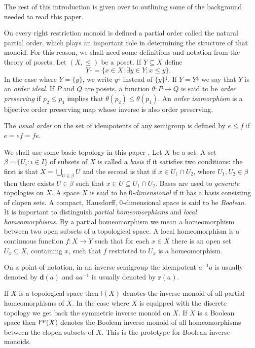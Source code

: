 \documentclass[a4paper]{amsart}
\begin{document}
The rest of this introduction is given over to outlining some of the background needed to read this paper.

On every right restriction monoid is defined a partial order called the natural partial order,
which plays an important role in determining the structure of that monoid.
For this reason, we shall need some definitions and notation from the theory of posets.
Let $(X,\leq)$ be a poset.
If $Y \subseteq X$ define 
$$Y^{\downarrow} = \{x \in X \colon \exists y \in Y;  x \leq y\}.$$
In the case where $Y = \{y\}$, we write  $y^{\downarrow}$ 
instead of $\{y\}^{\downarrow}$. 
If $Y = Y^{\downarrow}$ we say that $Y$ is an {\em order ideal}.
If $P$ and $Q$ are posets, a function $\theta \colon P \rightarrow Q$ is said to be {\em order preserving}
if $p_{2} \leq p_{1}$ implies that $\theta (p_{2}) \leq \theta (p_{1})$.
An {\em order isomorphism} is a bijective order preserving map
whose inverse is also order preserving.

The {\em usual order} on the set of idempotents of any semigroup is defined by $e \leq f$ if $e = ef = fe$.

We shall use some basic topology in this paper \cite{Willard}.
Let $X$ be a set.
A set $\beta = \{ U_{i} \colon i \in I \}$
of subsets of $X$ is called a {\em basis}
if it satisfies two conditions:
the first is that $X = \bigcup_{U \in \beta} U$
and the second is that if $x \in U_{1} \cap U_{2}$, where $U_{1},U_{2} \in \beta$
then there exists $U \in \beta$ such that $x \in U \subseteq U_{1} \cap U_{2}$.
Bases are used to {\em generate} topologies on $X$.
A space $X$ is said to be {\em $0$-dimensional} if it has a basis consisting
of clopen sets.
A compact, Hausdorff, $0$-dimensional space is said to be {\em Boolean}.
It is important to distinguish {\em partial homeomorphisms} and  {\em local homeomorphisms}.
By a partial homeomorphism we mean a homeomorphism between two open subsets of a topological space.
A local homeomorphism is a continuous function $f \colon X \rightarrow Y$
such that for each $x \in X$ there is an open set $U_{x} \subseteq X$, containing $x$,
such that $f$ restricted to $U_{x}$ is a homeomorphism.

On a point of notation, in an inverse semigroup the idempotent $a^{-1}a$ is usually denoted by $\mathbf{d}(a)$
and $aa^{-1}$ is usually denoted by $\mathbf{r}(a)$.

If $X$ is a topological space then $\mathsf{I}(X)$ denotes the inverse monoid
of all partial homeomorphisms of $X$. In the case where $X$ is equipped with the discrete topology
we get back the symmetric inverse monoid on $X$.
If $X$ is a Boolean space then $\mathsf{I}^{\tiny cp}(X)$ denotes the Boolean inverse monoid
of all homeomorphisms between the clopen subsets of $X$.
This is the prototype for Boolean inverse monoids.\\
\end{document}
